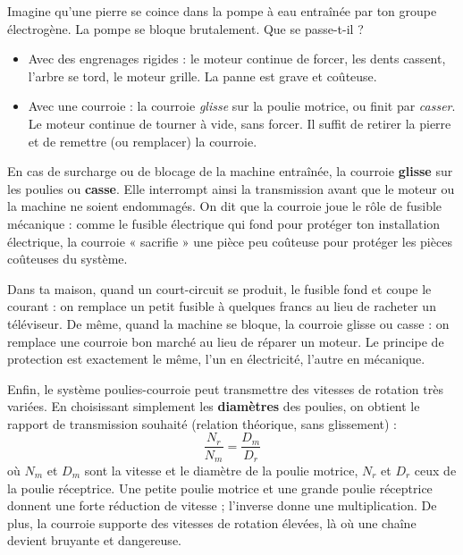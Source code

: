 \documentclass[11pt]{article}
\newcommand{\cle}[1]{{\popxbold\color{popdark}#1}}
\newcounter{popsec}
\newcounter{popsub}
\newcommand{\courssub}[1]{%
  \stepcounter{popsub}%
  \par\vspace{9pt}\noindent{\popxbold\fontsize{11.5}{13}\selectfont\color{popink}{\color{poporange}\thepopsec.\thepopsub}\hspace{6pt}#1}\par\nopagebreak\vspace{4pt}
}
\begin{document}
Imagine qu'une pierre se coince dans la pompe à eau entraînée par ton groupe électrogène. La pompe se bloque brutalement. Que se passe-t-il ?

\begin{itemize}
\item Avec des engrenages rigides : le moteur continue de forcer, les dents cassent, l'arbre se tord, le moteur grille. La panne est grave et coûteuse.
\item Avec une courroie : la courroie \emph{glisse} sur la poulie motrice, ou finit par \emph{casser}. Le moteur continue de tourner à vide, sans forcer. Il suffit de retirer la pierre et de remettre (ou remplacer) la courroie.
\end{itemize}

\begin{aretenir}
En cas de \cle{surcharge} ou de \cle{blocage} de la machine entraînée, la courroie \textbf{glisse} sur les poulies ou \textbf{casse}. Elle interrompt ainsi la transmission avant que le moteur ou la machine ne soient endommagés. On dit que la courroie joue le rôle de \cle{fusible mécanique} : comme le fusible électrique qui fond pour protéger ton installation électrique, la courroie « sacrifie » une pièce peu coûteuse pour protéger les pièces coûteuses du système.
\end{aretenir}

\begin{exemplebox}
Dans ta maison, quand un court-circuit se produit, le fusible fond et coupe le courant : on remplace un petit fusible à quelques francs au lieu de racheter un téléviseur. De même, quand la machine se bloque, la courroie glisse ou casse : on remplace une courroie bon marché au lieu de réparer un moteur. Le principe de protection est exactement le même, l'un en électricité, l'autre en mécanique.
\end{exemplebox}

\courssub{Grande gamme de vitesses transmissibles}

Enfin, le système poulies-courroie peut transmettre des vitesses de rotation très variées. En choisissant simplement les \textbf{diamètres} des poulies, on obtient le rapport de transmission souhaité (relation théorique, sans glissement) :
\[
\frac{N_{r}}{N_{m}} = \frac{D_{m}}{D_{r}}
\]
où $N_{m}$ et $D_{m}$ sont la vitesse et le diamètre de la poulie motrice, $N_{r}$ et $D_{r}$ ceux de la poulie réceptrice. Une petite poulie motrice et une grande poulie réceptrice donnent une forte réduction de vitesse ; l'inverse donne une multiplication. De plus, la courroie supporte des vitesses de rotation élevées, là où une chaîne devient bruyante et dangereuse.
\end{document}
